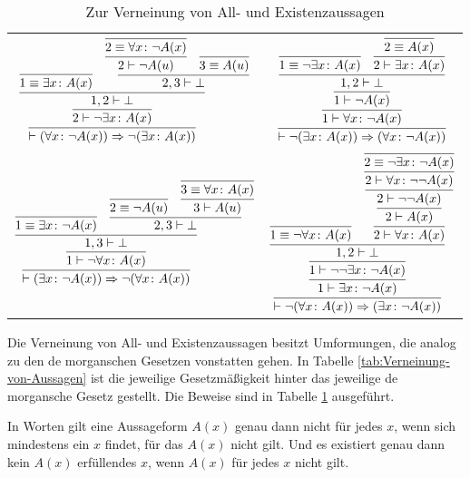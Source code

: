 \begin{table}
\begin{center}
\caption{Zur Verneinung von All- und Existenzaussagen}%
\label{tab:Negation-All-Ex}
\begin{tabular}{@{}cc@{}}
\toprule
$\infer{\vdash (\forall x\colon\lnot A(x))\cond \lnot (\exists x\colon A(x))}{
  \infer{2\vdash\lnot\exists x\colon A(x)}{
    \infer{1,2\vdash\bot}{
      \infer{1\equiv\exists x\colon A(x)}{}
    & \infer{2,3\vdash \bot}{
        \infer{2\vdash\lnot A(u)}{
          \infer{2\equiv\forall x\colon\lnot A(x)}{}}
      & \infer{3\equiv A(u)}{}}}}}$
&
$\infer{\vdash \lnot (\exists x\colon A(x))\cond (\forall x\colon\lnot A(x))}{
  \infer{1\vdash\forall x\colon\lnot A(x)}{
    \infer{1\vdash\lnot A(x)}{
      \infer{1, 2\vdash\bot}{
        \infer{1\equiv\lnot\exists x\colon A(x)}{}
      & \infer{2\vdash\exists x\colon A(x)}{
          \infer{2\equiv A(x)}{}}}}}}$\\[10pt]
$\infer{\vdash (\exists x\colon\lnot A(x))\cond \lnot (\forall x\colon A(x))}{
  \infer{1\vdash\lnot\forall x\colon A(x)}{
    \infer{1, 3\vdash\bot}{
      \infer{1\equiv\exists x\colon \lnot A(x)}{}
    & \infer{2, 3\vdash\bot}{
        \infer{2\equiv\lnot A(u)}{}
      & \infer{3\vdash A(u)}{
          \infer{3\equiv\forall x\colon A(x)}{}}}}}}$
&
$\infer{\vdash \lnot (\forall x\colon A(x))\cond (\exists x\colon\lnot A(x))}{
  \infer{1\vdash\exists x\colon\lnot A(x)}{
    \infer{1\vdash\lnot\lnot\exists x\colon\lnot A(x)}{
      \infer{1,2\vdash\bot}{
        \infer{1\equiv\lnot\forall x\colon A(x)}{}
      & \infer{2 \vdash\forall x\colon A(x)}{
          \infer{2\vdash A(x)}{
            \infer{2\vdash\lnot\lnot A(x)}{
              \infer{2\vdash\forall x\colon\lnot\lnot A(x)}{
                \infer{2\equiv\lnot\exists x\colon\lnot A(x)}{}}}}}}}}}$\\
\bottomrule
\end{tabular}
\end{center}
\end{table}

Die Verneinung von All- und Existenzaussagen besitzt Umformungen, die
analog zu den de morganschen Gesetzen vonstatten gehen. In Tabelle
\ref{tab:Verneinung-von-Aussagen} ist die jeweilige Gesetzmäßigkeit
hinter das jeweilige de morgansche Gesetz gestellt. Die Beweise sind in
Tabelle \ref{tab:Negation-All-Ex} ausgeführt.

In Worten gilt eine Aussageform $A(x)$ genau dann nicht für jedes $x$,
wenn sich mindestens ein $x$ findet, für das $A(x)$ nicht gilt.
Und es existiert genau dann kein $A(x)$ erfüllendes $x$, wenn
$A(x)$ für jedes $x$ nicht gilt.

